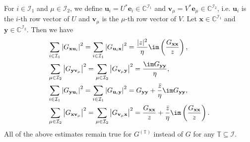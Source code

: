 \begin{lemma}\label{lem_comp_gbound}
For $i\in \mathcal I_1$ and $\mu\in \mathcal I_2$, we define $\mathbf u_i=U^* \mathbf e_i  \in \mathbb C^{\mathcal I_1}$ and $\mathbf v_\mu=V^* \mathbf e_\mu  \in \mathbb C^{\mathcal I_2}$, i.e. $\mathbf u_i$ is the $i$-th row vector of $U$ and $\mathbf v_\mu$ is the $\mu$-th row vector of $V$. Let $\mathbf x \in \mathbb C^{\mathcal I_1}$ and $\mathbf y \in \mathbb C^{\mathcal I_2}$. Then we have %
  \begin{align}
 & \sum_{i \in \mathcal I_1 }  \left| {G_{\mathbf x \mathbf u_i} } \right|^2  =\sum_{i \in \mathcal I_1 }  \left| {G_{ \mathbf u_i \mathbf x} } \right|^2  = \frac{|z|^2}{\eta}\im\left(\frac{ G_{\mathbf x\mathbf x}}{z}\right) , \label{eq_sgsq2} \\
& \sum_{\mu  \in \mathcal I_2 } {\left| {G_{\mathbf y \mathbf v_\mu } } \right|^2 }=\sum_{\mu  \in \mathcal I_2 } {\left| {G_{\mathbf v_\mu \mathbf y } } \right|^2 }  = \frac{{\im G_{\mathbf y\mathbf y} }}{\eta }, \label{eq_sgsq1}\\ 
& \sum_{i \in \mathcal I_1 } {\left| {G_{\mathbf y \mathbf u_i} } \right|^2 } =\sum_{i \in \mathcal I_1 } {\left| {G_{ \mathbf u_i \mathbf y} } \right|^2 } = {G}_{\mathbf y\mathbf y}  +\frac{\bar z}{\eta} \im G_{\mathbf y\mathbf y}  , \label{eq_sgsq3} \\
& \sum_{\mu \in \mathcal I_2 } {\left| {G_{\mathbf x \mathbf v_\mu} } \right|^2 }= \sum_{\mu \in \mathcal I_2 } {\left| {G_{\mathbf v_\mu \mathbf x } } \right|^2 }= \frac{G_{\mathbf x\mathbf x}}{z}  + \frac{\bar z}{\eta} \im \left(\frac{G_{\mathbf x\mathbf x}}{z}\right) .\label{eq_sgsq4}
 \end{align}
 All of the above estimates remain true for $G^{(\mathbb T)}$ instead of $G$ for any $\mathbb T \subseteq \mathcal I$. 
\end{lemma}
